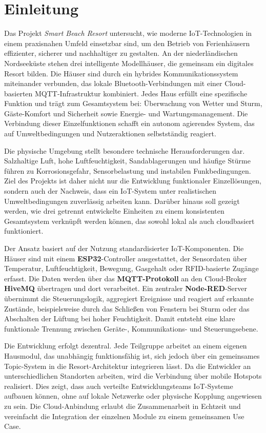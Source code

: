\section{Einleitung}
Das Projekt \textit{Smart Beach Resort} untersucht, wie moderne IoT-Technologien in einem praxisnahen Umfeld einsetzbar sind, um den Betrieb von Ferienhäusern effizienter, sicherer und nachhaltiger zu gestalten. 
An der niederländischen Nordseeküste stehen drei intelligente Modellhäuser, die gemeinsam ein digitales Resort bilden. 
Die Häuser sind durch ein hybrides Kommunikationssystem miteinander verbunden, das lokale Bluetooth-Verbindungen mit einer Cloud-basierten MQTT-Infrastruktur kombiniert. 
Jedes Haus erfüllt eine spezifische Funktion und trägt zum Gesamtsystem bei: Überwachung von Wetter und Sturm, Gäste-Komfort und Sicherheit sowie Energie- und Wartungsmanagement. 
Die Verbindung dieser Einzelfunktionen schafft ein autonom agierendes System, das auf Umweltbedingungen und Nutzeraktionen selbstständig reagiert.

Die physische Umgebung stellt besondere technische Herausforderungen dar. 
Salzhaltige Luft, hohe Luftfeuchtigkeit, Sandablagerungen und häufige Stürme führen zu Korrosionsgefahr, Sensorbelastung und instabilen Funkbedingungen. 
Ziel des Projekts ist daher nicht nur die Entwicklung funktionaler Einzellösungen, sondern auch der Nachweis, dass ein IoT-System unter realistischen Umweltbedingungen zuverlässig arbeiten kann. 
Darüber hinaus soll gezeigt werden, wie drei getrennt entwickelte Einheiten zu einem konsistenten Gesamtsystem verknüpft werden können, das sowohl lokal als auch cloudbasiert funktioniert.

Der Ansatz basiert auf der Nutzung standardisierter IoT-Komponenten. 
Die Häuser sind mit einem \textbf{ESP32}-Controller ausgestattet, der Sensordaten über Temperatur, Luftfeuchtigkeit, Bewegung, Gasgehalt oder RFID-basierte Zugänge erfasst. 
Die Daten werden über das \textbf{MQTT-Protokoll} an den Cloud-Broker \textbf{HiveMQ} übertragen und dort verarbeitet. 
Ein zentraler \textbf{Node-RED}-Server übernimmt die Steuerungslogik, aggregiert Ereignisse und reagiert auf erkannte Zustände, beispielsweise durch das Schließen von Fenstern bei Sturm oder das Abschalten der Lüftung bei hoher Feuchtigkeit. 
Damit entsteht eine klare funktionale Trennung zwischen Geräte-, Kommunikations- und Steuerungsebene.

Die Entwicklung erfolgt dezentral. 
Jede Teilgruppe arbeitet an einem eigenen Hausmodul, das unabhängig funktionsfähig ist, sich jedoch über ein gemeinsames Topic-System in die Resort-Architektur integrieren lässt. 
Da die Entwickler an unterschiedlichen Standorten arbeiten, wird die Verbindung über mobile Hotspots realisiert. 
Dies zeigt, dass auch verteilte Entwicklungsteams IoT-Systeme aufbauen können, ohne auf lokale Netzwerke oder physische Kopplung angewiesen zu sein. 
Die Cloud-Anbindung erlaubt die Zusammenarbeit in Echtzeit und vereinfacht die Integration der einzelnen Module zu einem gemeinsamen Use Case.

